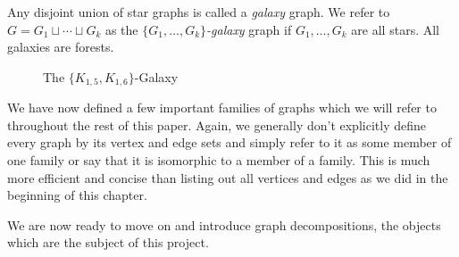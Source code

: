 \begin{definition}
    Any disjoint union of star graphs is called a \textit{galaxy} graph. We refer to $G=G_{1}\sqcup \cdots \sqcup G_{k}$ as the \textit{$\{G_{1},\hdots,G_{k}\}$-galaxy} graph if $G_{1},\hdots,G_{k}$ are all stars. All galaxies are forests.
\end{definition}

\begin{figure}[H]
    \begin{center}
    \end{center}
\caption{The $\{K_{1,5},K_{1,6}\}$-Galaxy}
    \label{fig:galaxy_close}
    \end{figure}
    
We have now defined a few important families of graphs which we will refer to throughout the rest of this paper. Again, we generally don't explicitly define every graph by its vertex and edge sets and simply refer to it as some member of one family or say that it is isomorphic to a member of a family. This is much more efficient and concise than listing out all vertices and edges as we did in the beginning of this chapter.

We are now ready to move on and introduce graph decompositions, the objects which are the subject of this project.
  














